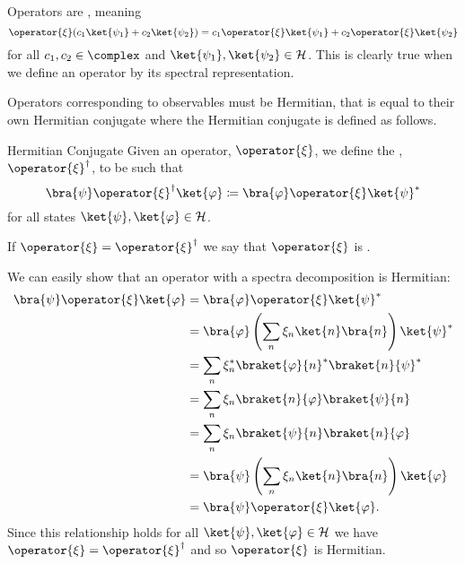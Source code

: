 \documentclass[fleqn]{NotesClass}
\newcommand*{\hilbert}{\mathcal{H}}
\newcommand*{\hermit}{\dagger}
\begin{document}
    Operators are , meaning
    \begin{equation}
        \operator{\xi} (c_1\ket{\psi_1} + c_2\ket{\psi_2}) = c_1\operator{\xi}\ket{\psi_1} + c_2\operator{\xi}\ket{\psi_2}
    \end{equation}
    for all \(c_1, c_2\in\complex\) and \(\ket{\psi_1}, \ket{\psi_2}\in\hilbert\).
    This is clearly true when we define an operator by its spectral representation.
    
    Operators corresponding to observables must be Hermitian, that is equal to their own Hermitian conjugate where the Hermitian conjugate is defined as follows.
    \begin{dfn}{Hermitian Conjugate}{}
        Given an operator, \(\operator{\xi}\), we define the , \(\operator{\xi}^\hermit\), to be such that
        \begin{equation}
            \bra{\psi} \operator{\xi}^\hermit \ket{\varphi} \coloneqq \bra{\varphi} \operator{\xi} \ket{\psi}^*
        \end{equation}
        for all states \(\ket{\psi}, \ket{\varphi} \in \hilbert\).
        
        If \(\operator{\xi} = \operator{\xi}^\hermit\) we say that \(\operator{\xi}\) is .
    \end{dfn}
    
    We can easily show that an operator with a spectra decomposition is Hermitian:
    \begin{align}
        \bra{\psi} \operator{\xi} \ket{\varphi} &= \bra{\varphi} \operator{\xi} \ket{\psi}^*\\
        &= \bra{\varphi} \left( \sum_n \xi_n\ket{n}\bra{n} \right) \ket{\psi}^*\\
        &= \sum_n \xi_n^*\braket{\varphi}{n}^*\braket{n}{\psi}^*\\
        &= \sum_n \xi_n \braket{n}{\varphi}\braket{\psi}{n}\\
        &= \sum_n \xi_n \braket{\psi}{n}\braket{n}{\varphi}\\
        &= \bra{\psi}\left( \sum_n \xi_n \ket{n}\bra{n} \right)\ket{\varphi}\\
        &= \bra{\psi} \operator{\xi} \ket{\varphi}.
    \end{align}
    Since this relationship holds for all \(\ket{\psi}, \ket{\varphi} \in \hilbert\) we have \(\operator{\xi} = \operator{\xi}^{\hermit}\) and so \(\operator{\xi}\) is Hermitian.
    
\end{document}
